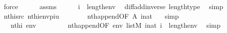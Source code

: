 \begin{isabellebody}
\ force\isanewline
\ \ \ \ \isamarkupfalse%
\ assms{\isacharparenleft}{\kern0pt}{}{\isacharparenright}{\kern0pt}\isanewline
\ \ \ \ \isamarkupfalse%
\ {\isachardoublequoteopen}i{\isacharhash}{\kern0pt}{\isacharminus}{\kern0pt}{}\ {\isacharless}{\kern0pt}\ length{\isacharparenleft}{\kern0pt}env{\isacharparenright}{\kern0pt}{\isachardoublequoteclose}\ \isamarkupfalse%
\ diff{\isacharunderscore}{\kern0pt}add{\isacharunderscore}{\kern0pt}inverse\ length{\isacharunderscore}{\kern0pt}type\ \isamarkupfalse%
\ simp\isanewline
\ \ \ \ \isamarkupfalse%
\ {\isachardoublequoteopen}nth{\isacharparenleft}{\kern0pt}i{\isacharcomma}{\kern0pt}{\isacharquery}{\kern0pt}src{\isacharparenright}{\kern0pt}\ {\isacharequal}{\kern0pt}nth{\isacharparenleft}{\kern0pt}i{\isacharhash}{\kern0pt}{\isacharminus}{\kern0pt}{}{\isacharcomma}{\kern0pt}env{\isacharat}{\kern0pt}{\isacharbrackleft}{\kern0pt}pi{\isacharcomma}{\kern0pt}u{\isacharbrackright}{\kern0pt}{\isacharparenright}{\kern0pt}{\isachardoublequoteclose}\isanewline
\ \ \ \ \ \ \isamarkupfalse%
\ nth{\isacharunderscore}{\kern0pt}append{\isacharbrackleft}{\kern0pt}OF\ A{\isacharparenleft}{\kern0pt}{}{\isacharparenright}{\kern0pt}\ {\isacartoucheopen}i{\isasymin}nat{\isacartoucheclose}{\isacharbrackright}{\kern0pt}\ {}\ \isamarkupfalse%
\ simp\isanewline
\ \ \ \ \isamarkupfalse%
\ \isanewline
\ \ \ \ \isamarkupfalse%
\ {\isachardoublequoteopen}{\isachardot}{\kern0pt}{\isachardot}{\kern0pt}{\isachardot}{\kern0pt}\ {\isacharequal}{\kern0pt}\ nth{\isacharparenleft}{\kern0pt}i{\isacharhash}{\kern0pt}{\isacharminus}{\kern0pt}{}{\isacharcomma}{\kern0pt}\ env{\isacharparenright}{\kern0pt}{\isachardoublequoteclose}\ \isanewline
\ \ \ \ \ \ \isamarkupfalse%
\ nth{\isacharunderscore}{\kern0pt}append{\isacharbrackleft}{\kern0pt}OF\ {\isacartoucheopen}env\ {\isasymin}list{\isacharparenleft}{\kern0pt}M{\isacharparenright}{\kern0pt}{\isacartoucheclose}\ {\isacartoucheopen}i{\isacharhash}{\kern0pt}{\isacharminus}{\kern0pt}{}{\isasymin}nat{\isacartoucheclose}{\isacharbrackright}{\kern0pt}\ {\isacartoucheopen}i{\isacharhash}{\kern0pt}{\isacharminus}{\kern0pt}{}\ {\isacharless}{\kern0pt}\ length{\isacharparenleft}{\kern0pt}env{\isacharparenright}{\kern0pt}{\isacartoucheclose}\ \isamarkupfalse%
\ simp\isanewline
\ \ \ \ \isamarkupfalse%
\ \isanewline
\ \ \ \ \isamarkupfalse%

\end{isabellebody}
